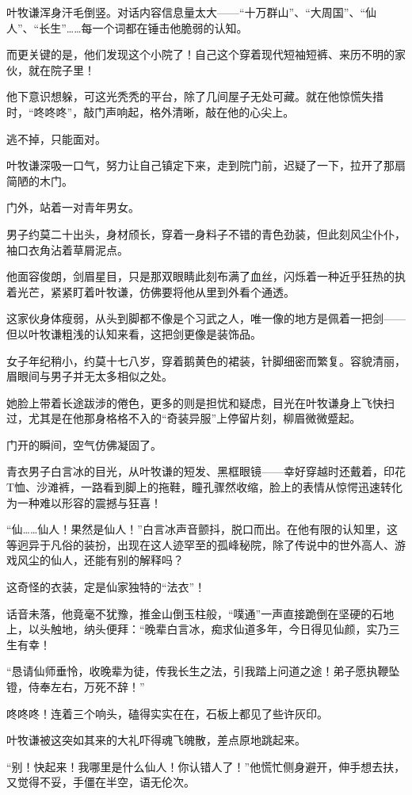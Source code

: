 叶牧谦浑身汗毛倒竖。对话内容信息量太大——“十万群山”、“大周国”、“仙人”、“长生”……每一个词都在锤击他脆弱的认知。

而更关键的是，他们发现这个小院了！自己这个穿着现代短袖短裤、来历不明的家伙，就在院子里！

他下意识想躲，可这光秃秃的平台，除了几间屋子无处可藏。就在他惊慌失措时，“咚咚咚”，敲门声响起，格外清晰，敲在他的心尖上。

逃不掉，只能面对。

叶牧谦深吸一口气，努力让自己镇定下来，走到院门前，迟疑了一下，拉开了那扇简陋的木门。

门外，站着一对青年男女。

男子约莫二十出头，身材颀长，穿着一身料子不错的青色劲装，但此刻风尘仆仆，袖口衣角沾着草屑泥点。

他面容俊朗，剑眉星目，只是那双眼睛此刻布满了血丝，闪烁着一种近乎狂热的执着光芒，紧紧盯着叶牧谦，仿佛要将他从里到外看个通透。

这家伙身体瘦弱，从头到脚都不像是个习武之人，唯一像的地方是佩着一把剑——但以叶牧谦粗浅的认知来看，这把剑更像是装饰品。

女子年纪稍小，约莫十七八岁，穿着鹅黄色的裙装，针脚细密而繁复。容貌清丽，眉眼间与男子并无太多相似之处。

她脸上带着长途跋涉的倦色，更多的则是担忧和疑虑，目光在叶牧谦身上飞快扫过，尤其是在他那身格格不入的“奇装异服”上停留片刻，柳眉微微蹙起。

门开的瞬间，空气仿佛凝固了。

青衣男子白言冰的目光，从叶牧谦的短发、黑框眼镜——幸好穿越时还戴着，印花T恤、沙滩裤，一路看到脚上的拖鞋，瞳孔骤然收缩，脸上的表情从惊愕迅速转化为一种难以形容的震撼与狂喜！

“仙……仙人！果然是仙人！”白言冰声音颤抖，脱口而出。在他有限的认知里，这等迥异于凡俗的装扮，出现在这人迹罕至的孤峰秘院，除了传说中的世外高人、游戏风尘的仙人，还能有别的解释吗？

这奇怪的衣装，定是仙家独特的“法衣”！

话音未落，他竟毫不犹豫，推金山倒玉柱般，“噗通”一声直接跪倒在坚硬的石地上，以头触地，纳头便拜：“晚辈白言冰，痴求仙道多年，今日得见仙颜，实乃三生有幸！

“恳请仙师垂怜，收晚辈为徒，传我长生之法，引我踏上问道之途！弟子愿执鞭坠镫，侍奉左右，万死不辞！”

咚咚咚！连着三个响头，磕得实实在在，石板上都见了些许灰印。

叶牧谦被这突如其来的大礼吓得魂飞魄散，差点原地跳起来。

“别！快起来！我哪里是什么仙人！你认错人了！”他慌忙侧身避开，伸手想去扶，又觉得不妥，手僵在半空，语无伦次。

